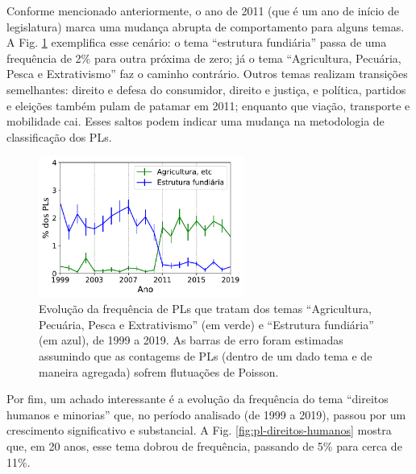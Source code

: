 \documentclass[12pt,a4paper]{article}
\begin{document}
Conforme mencionado anteriormente, o ano de 2011 (que é um ano de início de legislatura)
marca uma mudança abrupta de comportamento para alguns temas. A Fig. \ref{fig:pl-agricultura}
exemplifica esse cenário: o tema ``estrutura fundiária'' passa de uma frequência de 2\% para outra
próxima de zero; já o tema ``Agricultura, Pecuária, Pesca e Extrativismo'' faz o caminho contrário.
Outros temas realizam transições semelhantes: direito e defesa do consumidor, direito e justiça, e
política, partidos e eleições também pulam de patamar em 2011; enquanto que viação, transporte e
mobilidade cai. Esses saltos podem indicar uma mudança na metodologia de classificação dos PLs.

\begin{figure}[t]
\centering
\includegraphics[width=0.6\textwidth]{graficos/PL-agricultura-por-ano_2019-05-01.pdf}
\caption{Evolução da frequência de PLs que tratam dos temas ``Agricultura, Pecuária, Pesca e Extrativismo''
  (em verde) e ``Estrutura fundiária'' (em azul), de 1999 a 2019. As barras de erro foram estimadas
assumindo que as contagems de PLs (dentro de um dado tema e de maneira agregada) sofrem flutuações de Poisson.}
\label{fig:pl-agricultura}
\end{figure}

Por fim, um achado interessante é a evolução da frequência do tema ``direitos humanos e minorias'' que,
no período analisado (de 1999 a 2019), passou por um crescimento significativo e substancial.
A Fig. \ref{fig:pl-direitos-humanos} mostra que, em 20 anos, esse tema dobrou de frequência, passando de
5\% para cerca de 11\%.
\end{document}
